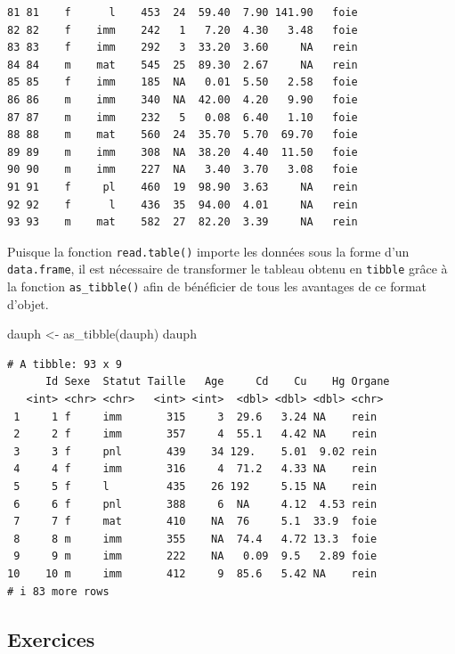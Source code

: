 \documentclass[
  a4paper,
  DIV=11,
  numbers=noendperiod,
  oneside]{scrreprt}
\newenvironment{Shaded}{}{}
\newcommand{\FunctionTok}[1]{\textcolor[rgb]{0.44,0.26,0.76}{#1}}
\newcommand{\NormalTok}[1]{\textcolor[rgb]{0.14,0.16,0.18}{#1}}
\newcommand{\OtherTok}[1]{\textcolor[rgb]{0.44,0.26,0.76}{#1}}
\begin{document}
\begin{verbatim}
81 81    f      l    453  24  59.40  7.90 141.90   foie
82 82    f    imm    242   1   7.20  4.30   3.48   foie
83 83    f    imm    292   3  33.20  3.60     NA   rein
84 84    m    mat    545  25  89.30  2.67     NA   rein
85 85    f    imm    185  NA   0.01  5.50   2.58   foie
86 86    m    imm    340  NA  42.00  4.20   9.90   foie
87 87    m    imm    232   5   0.08  6.40   1.10   foie
88 88    m    mat    560  24  35.70  5.70  69.70   foie
89 89    m    imm    308  NA  38.20  4.40  11.50   foie
90 90    m    imm    227  NA   3.40  3.70   3.08   foie
91 91    f     pl    460  19  98.90  3.63     NA   rein
92 92    f      l    436  35  94.00  4.01     NA   rein
93 93    m    mat    582  27  82.20  3.39     NA   rein
\end{verbatim}

Puisque la fonction \texttt{read.table()} importe les données sous la
forme d'un \texttt{data.frame}, il est nécessaire de transformer le
tableau obtenu en \texttt{tibble} grâce à la fonction
\texttt{as\_tibble()} afin de bénéficier de tous les avantages de ce
format d'objet.

\begin{Shaded}
\begin{Highlighting}[]
\NormalTok{dauph }\OtherTok{\textless{}{-}} \FunctionTok{as\_tibble}\NormalTok{(dauph)}
\NormalTok{dauph}
\end{Highlighting}
\end{Shaded}

\begin{verbatim}
# A tibble: 93 x 9
      Id Sexe  Statut Taille   Age     Cd    Cu    Hg Organe
   <int> <chr> <chr>   <int> <int>  <dbl> <dbl> <dbl> <chr> 
 1     1 f     imm       315     3  29.6   3.24 NA    rein  
 2     2 f     imm       357     4  55.1   4.42 NA    rein  
 3     3 f     pnl       439    34 129.    5.01  9.02 rein  
 4     4 f     imm       316     4  71.2   4.33 NA    rein  
 5     5 f     l         435    26 192     5.15 NA    rein  
 6     6 f     pnl       388     6  NA     4.12  4.53 rein  
 7     7 f     mat       410    NA  76     5.1  33.9  foie  
 8     8 m     imm       355    NA  74.4   4.72 13.3  foie  
 9     9 m     imm       222    NA   0.09  9.5   2.89 foie  
10    10 m     imm       412     9  85.6   5.42 NA    rein  
# i 83 more rows
\end{verbatim}

\subsection{Exercices}\label{sec-exo-10}
\end{document}
